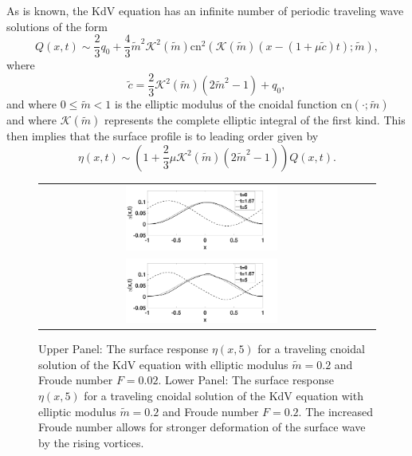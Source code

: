 \documentclass[a4paper,11pt]{article}
\begin{document}
As is known, the KdV equation has an infinite number of periodic traveling wave solutions of the form 
\begin{equation}
Q(x,t) \sim \frac{2}{3}q_{0} + \frac{4}{3} \tilde{m}^{2}\mathcal{K}^2(\tilde{m})\mbox{cn}^{2}\left(\mathcal{K}(\tilde{m}) \left( x- \left(1 + \mu \tilde{c}\right)t\right);\tilde{m}\right),
\label{kdvsolpot}
\end{equation}
where
\[
\tilde{c} = \frac{2}{3}\mathcal{K}^{2}(\tilde{m}) (2\tilde{m}^{2}-1)+q_{0},
\]
and where $0\leq \tilde{m}<1$ is the elliptic modulus of the cnoidal function $\mbox{cn}(\cdot;\tilde{m})$ and where $\mathcal{K}(\tilde{m})$ represents the complete elliptic integral of the first kind.  This then implies that the surface profile is to leading order given by 
\begin{equation}
\eta(x,t) \sim \left(1+\frac{2}{3}\mu \mathcal{K}^{2}(\tilde{m})(2\tilde{m}^{2}-1)\right)Q(x,t).
\label{kdvsolsurf}
\end{equation}
%
\begin{figure}[h]
\centering
\begin{tabular}{cc}
\includegraphics[width=0.48\textwidth]{surf_resp_cnoid_mu_pt2_F_pt02_tf_5NEW} \\
\includegraphics[width=0.48\textwidth]{surf_resp_cnoid_mu_pt2_F_pt2_tf_5NEW}
\end{tabular}
\caption{\small Upper Panel: The surface response $\eta(x,5)$ for a traveling cnoidal solution of the KdV equation with elliptic modulus $\tilde{m}=0.2$ and Froude number $F=0.02$. Lower Panel: The surface response $\eta(x,5)$ for a traveling cnoidal solution of the KdV equation with elliptic modulus $\tilde{m}=0.2$ and Froude number $F=0.2$. The increased Froude number allows for stronger deformation of the surface wave by the rising vortices.}
\label{fig:cnsurfrep}
\end{figure}
%
\end{document}
